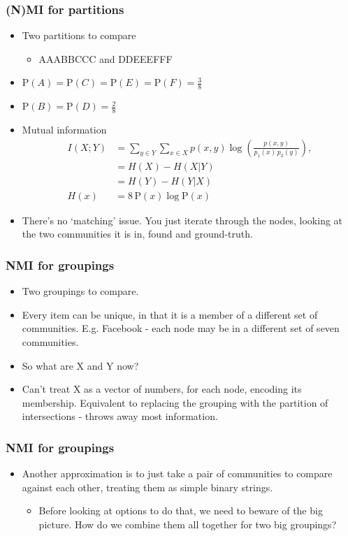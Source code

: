 \documentclass{beamer}
\newcommand{\subitem}[1]{\begin{itemize} \item #1 \end{itemize}}
\begin{document}
\frame
{
  \frametitle{(N)MI for partitions}

  \begin{itemize}
  \item Two partitions to compare
  	\begin{itemize}
		\item AAABBCCC and DDEEEFFF
  	\end{itemize}
  \item $ \mathrm{P}(A) = \mathrm{P}(C) = \mathrm{P}(E) = \mathrm{P}(F) = \frac38 $
  \item $ \mathrm{P}(B) = \mathrm{P}(D) = \frac28 $
	\item Mutual information
		\begin{align*}
 		I(X;Y) &= \sum_{y \in Y} \sum_{x \in X} 
                 		p(x,y) \log{ \left( \frac{p(x,y)}{p_1(x)\,p_2(y)}
                              		\right) },                           \\
				&= H(X) - H (X|Y)                                              \\
				&= H(Y) - H (Y|X)                                              \\
		H(x)		&= 8 \, \mathrm{P}(x) \log \mathrm{P}(x)
		\end{align*}
	\item There's no `matching' issue. You just iterate through the nodes, looking at the two communities it is in, found and ground-truth.
  \end{itemize}
}

\frame
{
  \frametitle{NMI for groupings}

  \begin{itemize}
  \item Two groupings to compare.
	\item Every item can be unique, in that it is a member of a different set of communities. E.g. Facebook - each node may be in a different set of seven communities.
	\item So what are X and Y now?
	\item Can't treat X as a vector of numbers, for each node, encoding its membership. Equivalent to replacing the grouping with the partition of intersections - throws away most information.
  \end{itemize}
}

\frame
{
  \frametitle{NMI for groupings}

  \begin{itemize}
	\item Another approximation is to just take a pair of communities to compare against each other, treating them as simple binary strings.
	\subitem{Before looking at options to do that, we need to beware of the big picture. How do we combine them all together for two big groupings?}
  \end{itemize}
}
\end{document}
